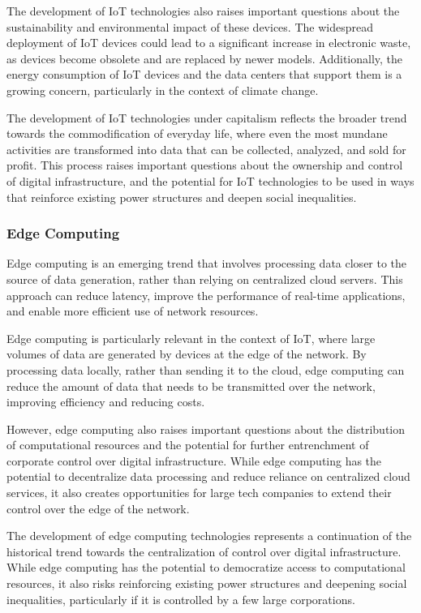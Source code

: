 \begin{refsection}
\begin{multicols}{2}
{The development of IoT technologies also raises important questions about the sustainability and environmental impact of these devices. The widespread deployment of IoT devices could lead to a significant increase in electronic waste, as devices become obsolete and are replaced by newer models. Additionally, the energy consumption of IoT devices and the data centers that support them is a growing concern, particularly in the context of climate change.

The development of IoT technologies under capitalism reflects the broader trend towards the commodification of everyday life, where even the most mundane activities are transformed into data that can be collected, analyzed, and sold for profit. This process raises important questions about the ownership and control of digital infrastructure, and the potential for IoT technologies to be used in ways that reinforce existing power structures and deepen social inequalities.

\subsubsection{Edge Computing}

Edge computing is an emerging trend that involves processing data closer to the source of data generation, rather than relying on centralized cloud servers. This approach can reduce latency, improve the performance of real-time applications, and enable more efficient use of network resources.

Edge computing is particularly relevant in the context of IoT, where large volumes of data are generated by devices at the edge of the network. By processing data locally, rather than sending it to the cloud, edge computing can reduce the amount of data that needs to be transmitted over the network, improving efficiency and reducing costs.

However, edge computing also raises important questions about the distribution of computational resources and the potential for further entrenchment of corporate control over digital infrastructure. While edge computing has the potential to decentralize data processing and reduce reliance on centralized cloud services, it also creates opportunities for large tech companies to extend their control over the edge of the network.

The development of edge computing technologies represents a continuation of the historical trend towards the centralization of control over digital infrastructure. While edge computing has the potential to democratize access to computational resources, it also risks reinforcing existing power structures and deepening social inequalities, particularly if it is controlled by a few large corporations.

}
\end{multicols}
\end{refsection}
